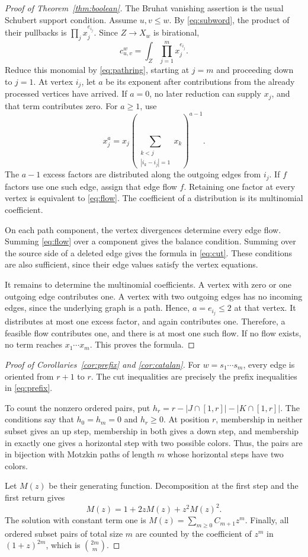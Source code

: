 \documentclass[11pt]{article}
\begin{document}
\begin{proof}[Proof of Theorem~\ref{thm:boolean}]
The Bruhat vanishing assertion is the usual Schubert support condition. Assume $u,v\leq w$. By \eqref{eq:subword}, the product of their pullbacks is $\prod_jx_j^{e_{i_j}}$. Since $Z\to X_w$ is birational,
\[
 c_{u,v}^{w}=\int_Z\prod_{j=1}^m x_j^{e_{i_j}}.
\]
Reduce this monomial by \eqref{eq:pathring}, starting at $j=m$ and proceeding down to $j=1$. At vertex $i_j$, let $a$ be its exponent after contributions from the already processed vertices have arrived. If $a=0$, no later reduction can supply $x_j$, and that term contributes zero. For $a\geq1$, use
\[
 x_j^a=x_j\left(\sum_{\substack{k<j\\|i_k-i_j|=1}}x_k\right)^{a-1}.
\]
The $a-1$ excess factors are distributed along the outgoing edges from $i_j$. If $f$ factors use one such edge, assign that edge flow $f$. Retaining one factor at every vertex is equivalent to \eqref{eq:flow}. The coefficient of a distribution is its multinomial coefficient.

On each path component, the vertex divergences determine every edge flow. Summing \eqref{eq:flow} over a component gives the balance condition. Summing over the source side of a deleted edge gives the formula in \eqref{eq:cut}. These conditions are also sufficient, since their edge values satisfy the vertex equations.

It remains to determine the multinomial coefficients. A vertex with zero or one outgoing edge contributes one. A vertex with two outgoing edges has no incoming edges, since the underlying graph is a path. Hence, $a=e_{i_j}\leq2$ at that vertex. It distributes at most one excess factor, and again contributes one. Therefore, a feasible flow contributes one, and there is at most one such flow. If no flow exists, no term reaches $x_1\cdots x_m$. This proves the formula.
\end{proof}

\begin{proof}[Proof of Corollaries~\ref{cor:prefix} and \ref{cor:catalan}]
For $w=s_1\cdots s_m$, every edge is oriented from $r+1$ to $r$. The cut inequalities are precisely the prefix inequalities in \eqref{eq:prefix}.

To count the nonzero ordered pairs, put $h_r=r-|J\cap[1,r]|-|K\cap[1,r]|$. The conditions say that $h_0=h_m=0$ and $h_r\geq0$. At position $r$, membership in neither subset gives an up step, membership in both gives a down step, and membership in exactly one gives a horizontal step with two possible colors. Thus, the pairs are in bijection with Motzkin paths of length $m$ whose horizontal steps have two colors.

Let $M(z)$ be their generating function. Decomposition at the first step and the first return gives
\[
 M(z)=1+2zM(z)+z^2M(z)^2.
\]
The solution with constant term one is $M(z)=\sum_{m\geq0}C_{m+1}z^m$. Finally, all ordered subset pairs of total size $m$ are counted by the coefficient of $z^m$ in $(1+z)^{2m}$, which is $\binom{2m}{m}$.
\end{proof}
\end{document}
